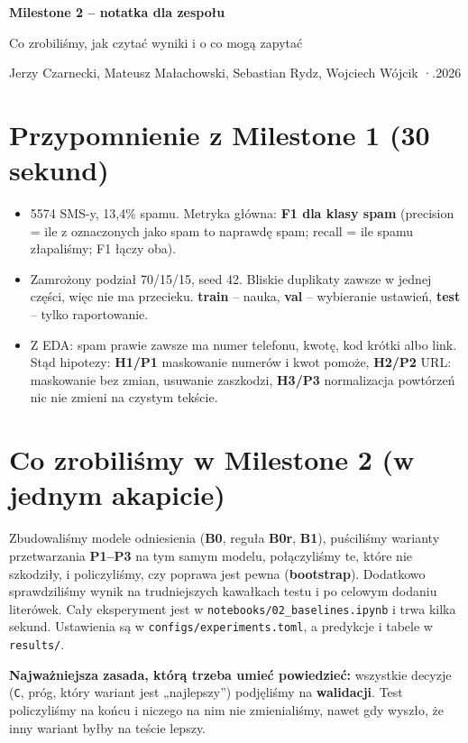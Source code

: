 \documentclass[11pt,a4paper]{article}
\begin{document}
{\LARGE\bfseries Milestone 2 -- notatka dla zespołu\par}
\vspace{2pt}
{\large Co zrobiliśmy, jak czytać wyniki i o co mogą zapytać\par}
\vspace{4pt}
{\small Jerzy Czarnecki, Mateusz Małachowski, Sebastian Rydz, Wojciech Wójcik \quad·.2026}

\section{Przypomnienie z Milestone 1 (30 sekund)}

\begin{itemize}
  \item 5574 SMS-y, 13,4\% spamu. Metryka główna: \textbf{F1 dla klasy spam} (precision = ile z oznaczonych jako spam to
        naprawdę spam; recall = ile spamu złapaliśmy; F1 łączy oba).
  \item Zamrożony podział 70/15/15, seed 42. Bliskie duplikaty zawsze w jednej części, więc nie ma przecieku.
        \textbf{train} -- nauka, \textbf{val} -- wybieranie ustawień, \textbf{test} -- tylko raportowanie.
  \item Z EDA: spam prawie zawsze ma numer telefonu, kwotę, kod krótki albo link. Stąd hipotezy:
        \textbf{H1/P1} maskowanie numerów i kwot pomoże, \textbf{H2/P2} URL: maskowanie bez zmian, usuwanie zaszkodzi,
        \textbf{H3/P3} normalizacja powtórzeń nic nie zmieni na czystym tekście.
\end{itemize}

\section{Co zrobiliśmy w Milestone 2 (w jednym akapicie)}

Zbudowaliśmy modele odniesienia (\textbf{B0}, reguła \textbf{B0r}, \textbf{B1}), puściliśmy warianty przetwarzania
\textbf{P1--P3} na tym samym modelu, połączyliśmy te, które nie szkodziły, i policzyliśmy, czy poprawa jest pewna
(\textbf{bootstrap}). Dodatkowo sprawdziliśmy wynik na trudniejszych kawałkach testu i po celowym dodaniu literówek.
Cały eksperyment jest w \texttt{notebooks/02\_baselines.ipynb} i trwa kilka sekund. Ustawienia są w
\texttt{configs/experiments.toml}, a predykcje i tabele w \texttt{results/}.

\begin{uwaga}
\textbf{Najważniejsza zasada, którą trzeba umieć powiedzieć:} wszystkie decyzje (\texttt{C}, próg, który wariant jest
„najlepszy”) podjęliśmy na \textbf{walidacji}. Test policzyliśmy na końcu i niczego na nim nie zmienialiśmy, nawet gdy
wyszło, że inny wariant byłby na teście lepszy.
\end{uwaga}
\end{document}
